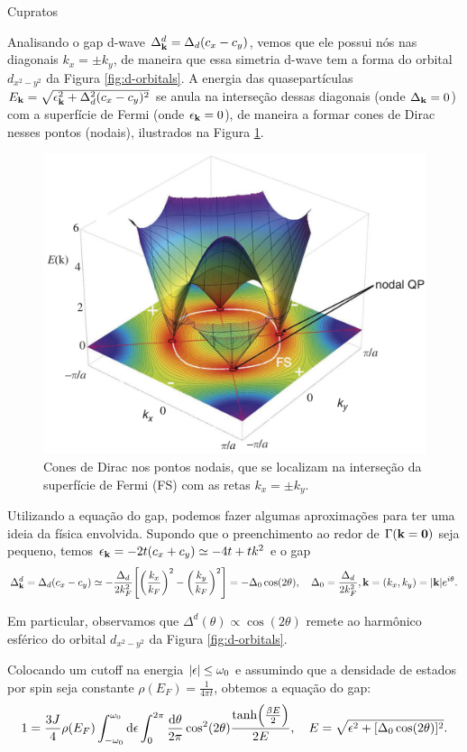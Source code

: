\documentclass[a4paper,10pt]{article}
\begin{document}
\begin{section}{Cupratos}
\n


Analisando o gap d-wave $\Delta_{\vb{k}}^d = \Delta_d (c_x - c_y)$, vemos que ele possui nós nas diagonais $k_x = \pm k_y$, de maneira que essa simetria d-wave tem a forma do orbital $d_{x^2-y^2}$ da Figura \ref{fig:d-orbitals}. A energia das quasepartículas $E_{\vb{k}} = \sqrt{\epsilon_{\vb{k}}^2 + \Delta_d^2 (c_x - c_y)^2}$ se anula na interseção dessas diagonais (onde $\Delta_{\vb{k}} = 0$) com a superfície de Fermi (onde $\epsilon_{\vb{k}} = 0$), de maneira a formar cones de Dirac nesses pontos (nodais), ilustrados na Figura \ref{fig:fermisurf}.

\begin{figure}[H]
\centering
\includegraphics[width=0.8\linewidth]{fig/fermisurf.png}
\caption{Cones de Dirac nos pontos nodais, que se localizam na interseção da superfície de Fermi (FS) com as retas $k_x = \pm k_y$.}
\label{fig:fermisurf}
\end{figure}


Utilizando a equação do gap, podemos fazer algumas aproximações para ter uma ideia da física envolvida. Supondo que o preenchimento ao redor de $\Gamma (\vb{k} = \vb{0})$ seja pequeno, temos $\epsilon_{\vb{k}} = -2t (c_x + c_y) \simeq -4t  + t k^2$ e o gap
$$
\Delta_{\vb{k}}^d = \Delta_d (c_x - c_y) \simeq -\frac{\Delta_d}{2 k_F^2}
\qty[\qty(\frac{k_x}{k_F})^2 - \qty(\frac{k_y}{k_F})^2] = - \Delta_0 \cos(2\theta),
\quad \Delta_0 = \frac{\Delta_d}{2 k_F^2}, \vb{k} = (k_x, k_y) = \abs{\vb{k}} e^{i\theta}.
$$

Em particular, observamos que $\Delta^d(\theta) \propto \cos(2\theta)$ remete ao harmônico esférico do orbital $d_{x^2 - y^2}$ da Figura \ref{fig:d-orbitals}.

\n

Colocando um cutoff na energia $\abs{\epsilon} \leq \omega_0$ e assumindo que a densidade de estados por spin seja constante $\rho(E_F) = \frac{1}{4\pi t}$, obtemos a equação do gap:
$$
1 = \frac{3 J}{4} \rho(E_F) \int_{-\omega_0}^{\omega_0} \dd{\epsilon}
\int_0^{2\pi} \frac{\dd{\theta}}{2\pi} \cos[2](2\theta) \frac{\tanh(\frac{\beta E}{2})}{2E}, \quad E = \sqrt{\epsilon^2 + [\Delta_0 \cos(2\theta)]^2}.
$$


\end{section}
\end{document}
